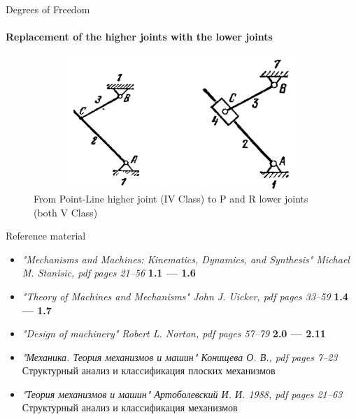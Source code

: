 \documentclass[aspectratio=169]{beamer}
\newcommand{\fbckg}[1]{\usebackgroundtemplate{\texttt{[image: \#1]}}}%
\begin{document}
\begin{frame}[t]{Degrees of Freedom}
    \framesubtitle{Replacement of the higher joints with the lower joints}
    \vspace{-0.5cm}
        \begin{figure}[H]
            \centering\includegraphics[height=5cm,width=1\textwidth,keepaspectratio]{from_h_to_l_mech.png}
            \caption*{From Point-Line higher joint (IV Class) to P and R lower joints (both V Class)}
            \label{from_h_to_l_mech.png}
        \end{figure}
    \end{frame}

\begin{frame}[t]{Reference material}
    \begin{itemize}
        \item \textit{"Mechanisms and Machines: Kinematics, Dynamics, and Synthesis" Michael M. Stanisic, pdf pages 21--56 } \textbf{1.1 --- 1.6}
        \item \textit{"Theory of Machines and Mechanisms" John J. Uicker, pdf pages 33--59 } \textbf{1.4 --- 1.7}
        \item \textit{"Design of machinery" Robert L. Norton, pdf pages 57--79 } \textbf{2.0 --- 2.11}
        \item \textit{"Механика. Теория механизмов и машин" Конищева О. В., pdf pages 7--23 } \\ Структурный анализ и классификация плоских механизмов
        \item \textit{"Теория механизмов и машин" Артоболевский И. И. 1988, pdf pages 21--63 } \\ Структурный анализ и классификация механизмов
    \end{itemize}
\end{frame}

\fbckg{fibeamer/figs/last_page.png}
\frame[plain]{}
\end{document}
